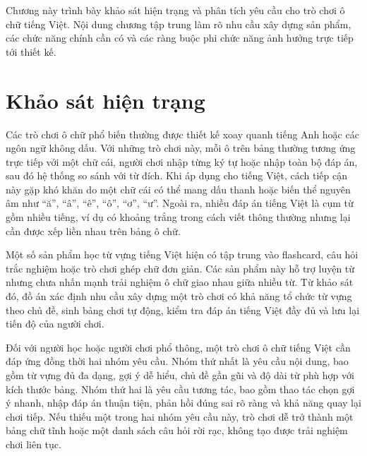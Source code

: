 \documentclass[../DoAn.tex]{subfiles}
\begin{document}
Chương này trình bày khảo sát hiện trạng và phân tích yêu cầu cho trò chơi ô chữ tiếng Việt. Nội dung chương tập trung làm rõ nhu cầu xây dựng sản phẩm, các chức năng chính cần có và các ràng buộc phi chức năng ảnh hưởng trực tiếp tới thiết kế.

\section{Khảo sát hiện trạng}
\label{section:2.1}
Các trò chơi ô chữ phổ biến thường được thiết kế xoay quanh tiếng Anh hoặc các ngôn ngữ không dấu. Với những trò chơi này, mỗi ô trên bảng thường tương ứng trực tiếp với một chữ cái, người chơi nhập từng ký tự hoặc nhập toàn bộ đáp án, sau đó hệ thống so sánh với từ đích. Khi áp dụng cho tiếng Việt, cách tiếp cận này gặp khó khăn do một chữ cái có thể mang dấu thanh hoặc biến thể nguyên âm như ``ă'', ``â'', ``ê'', ``ô'', ``ơ'', ``ư''. Ngoài ra, nhiều đáp án tiếng Việt là cụm từ gồm nhiều tiếng, ví dụ có khoảng trắng trong cách viết thông thường nhưng lại cần được xếp liền nhau trên bảng ô chữ.

Một số sản phẩm học từ vựng tiếng Việt hiện có tập trung vào flashcard, câu hỏi trắc nghiệm hoặc trò chơi ghép chữ đơn giản. Các sản phẩm này hỗ trợ luyện từ nhưng chưa nhấn mạnh trải nghiệm ô chữ giao nhau giữa nhiều từ. Từ khảo sát đó, đồ án xác định nhu cầu xây dựng một trò chơi có khả năng tổ chức từ vựng theo chủ đề, sinh bảng chơi tự động, kiểm tra đáp án tiếng Việt đầy đủ và lưu lại tiến độ của người chơi.

Đối với người học hoặc người chơi phổ thông, một trò chơi ô chữ tiếng Việt cần đáp ứng đồng thời hai nhóm yêu cầu. Nhóm thứ nhất là yêu cầu nội dung, bao gồm từ vựng đủ đa dạng, gợi ý dễ hiểu, chủ đề gần gũi và độ dài từ phù hợp với kích thước bảng. Nhóm thứ hai là yêu cầu tương tác, bao gồm thao tác chọn gợi ý nhanh, nhập đáp án thuận tiện, phản hồi đúng sai rõ ràng và khả năng quay lại chơi tiếp. Nếu thiếu một trong hai nhóm yêu cầu này, trò chơi dễ trở thành một bảng chữ tĩnh hoặc một danh sách câu hỏi rời rạc, không tạo được trải nghiệm chơi liên tục.
\end{document}
